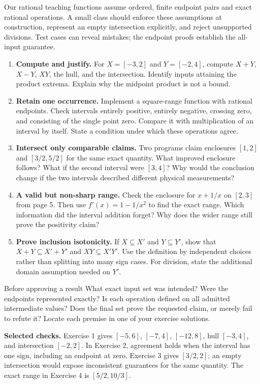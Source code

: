\newpage
{}
Our rational teaching functions assume ordered, finite endpoint pairs and exact
rational operations. A small class should enforce these assumptions at construction,
represent an empty intersection explicitly, and reject unsupported divisions.
Test cases can reveal mistakes; the endpoint proofs establish the all-input guarantee.
\begin{enumerate}
\item \textbf{Compute and justify.} For $X=[-3,2]$ and $Y=[-2,4]$, compute
$X+Y$, $X-Y$, $XY$, the hull, and the intersection. Identify inputs attaining the
product extrema. Explain why the midpoint product is not a bound.
\item \textbf{Retain one occurrence.} Implement a square-range function with
rational endpoints. Check intervals entirely positive, entirely negative, crossing
zero, and consisting of the single point zero. Compare it with multiplication of
an interval by itself. State a condition under which these operations agree.
\item \textbf{Intersect only comparable claims.} Two programs claim enclosures
$[1,2]$ and $[3/2,5/2]$ for the same exact quantity. What improved enclosure follows?
What if the second interval were $[3,4]$? Why would the conclusion change if the
two intervals described different physical measurements?
\item \textbf{A valid but non-sharp range.} Check the enclosure for $x+1/x$ on
$[2,3]$ from page 5. Then use $f'(x)=1-1/x^2$ to find the exact range. Which
information did the interval addition forget? Why does the wider range still
prove the positivity claim?
\item \textbf{Prove inclusion isotonicity.} If $X\subseteq X'$ and $Y\subseteq Y'$,
show that $X+Y\subseteq X'+Y'$ and $XY\subseteq X'Y'$. Use the definition by
independent choices rather than splitting into many sign cases. For division,
state the additional domain assumption needed on $Y'$.
\end{enumerate}
\begin{question}{Before approving a result}
What exact input set was intended? Were the endpoints represented exactly? Is each
operation defined on all admitted intermediate values? Does the final set prove
the requested claim, or merely fail to refute it? Locate each premise in one of
your exercise solutions.
\end{question}
\textbf{Selected checks.} Exercise 1 gives $[-5,6]$, $[-7,4]$, $[-12,8]$,
hull $[-3,4]$, and intersection $[-2,2]$. In Exercise 2, agreement holds when the
interval has one sign, including an endpoint at zero. Exercise 3 gives $[3/2,2]$;
an empty intersection would expose inconsistent guarantees for the same quantity.
The exact range in Exercise 4 is $[5/2,10/3]$.



